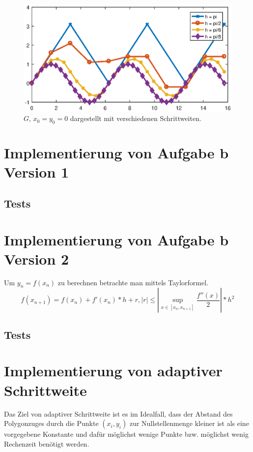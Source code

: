 \documentclass[a4paper,11pt,bibliography=totoc,listof=totoc,headinclude=true,cleardoublepage=empty,oneside]{scrartcl}
\begin{document}
\begin{figure}[h]
\centering
\includegraphics[width=0.85\linewidth]{plots/A/vieleSinuse_Schrittweiten.eps}
\caption{$G$, $x_0 = y_0 = 0$ dargestellt mit verschiedenen Schrittweiten.}
\label{fig:vieleSinuse_schrittweiten_a}
\end{figure}


	
\section{Implementierung von Aufgabe b Version 1}

\subsection{Tests}

\section{Implementierung von Aufgabe b Version 2}

Um $y_n = f(x_n)$ zu berechnen betrachte man mittels Taylorformel.
\[
f(x_{n+1})=f(x_n)+f'(x_n)*h+r, \left|r\right|\leq \left|\sup\limits_{x \in \left[x_n,x_{n+1}\right]}\frac{f''(x)}{2}\right|*h^2
\]
\subsection{Tests}

\section{Implementierung von adaptiver Schrittweite}
Das Ziel von adaptiver Schrittweite ist es im Idealfall, dass der Abstand des Polygonzuges durch die Punkte $(x_i,y_i)$ zur Nullstellenmenge kleiner ist als eine vorgegebene Konstante und dafür möglichst wenige Punkte bzw. möglichst wenig Rechenzeit benötigt werden.
\end{document}
